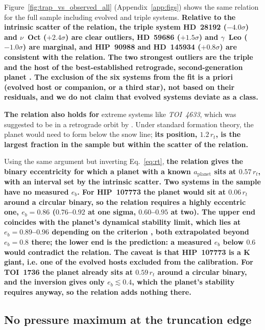 \documentclass{aa}
\newcommand{\rev}[1]{{\color{red}\textbf{#1}}}
\begin{document}
Figure~\ref{fig:trap_vs_observed_all} (Appendix~\ref{app:figs}) shows
the same relation for the full sample including evolved and triple
systems. \rev{Relative to the intrinsic scatter of the relation, the
triple system HD~28192 ($-4.0\sigma$) and $\nu$~Oct ($+2.4\sigma$) are
clear outliers, HD~59686 ($+1.5\sigma$) and $\gamma$~Leo ($-1.0\sigma$)
are marginal, and HIP~90988 and HD~145934 ($+0.8\sigma$) are consistent
with the relation. The two strongest outliers are the triple and the
host of the best-established retrograde, second-generation planet
\citep{cheng_retrograde_2025}. The exclusion of the six systems from the
fit is a priori (evolved host or companion, or a third star), not based
on their residuals, and we do not claim that evolved systems deviate as
a class.}

\rev{The relation also holds for} extreme systems like
\textit{TOI~4633}, which was suggested to be in a retrograde orbit by
\citet{Stegmann2025}. Under standard formation theory, the planet would
need to form below the snow line; \rev{its position, $1.2\,r_t$, is the
largest fraction in the sample but within the scatter of the relation.}

Using the same argument but inverting Eq.~\eqref{eq:rt}, \rev{the
relation gives the binary eccentricity for which a planet with a known
$a_\mathrm{planet}$ sits at $0.57\,r_t$, with an interval set by the
intrinsic scatter. Two systems in the sample have no measured $e_b$.
For HIP~107773 the planet would sit at $0.06\,r_t$ around a circular
binary, so the relation requires a highly eccentric one,
$e_b = 0.86$ ($0.76$--$0.92$ at one sigma, $0.60$--$0.95$ at two). The
upper end coincides with the planet's dynamical stability limit, which
lies at $e_b = 0.89$--$0.96$ depending on the criterion
\citep{Holman1999, Quarles_2020}, both extrapolated beyond $e_b = 0.8$
there; the lower end is the prediction: a measured $e_b$ below $0.6$
would contradict the relation. The caveat is that
HIP~107773 is a K giant, i.e. one of the evolved hosts excluded from the
calibration. For TOI~1736 the planet already sits at $0.59\,r_t$ around
a circular binary, and the inversion gives only $e_b \lesssim 0.4$,
which the planet's stability requires anyway, so the relation adds
nothing there.}

\subsection{No pressure maximum at the truncation edge}
\label{sec:model_results}
\end{document}
